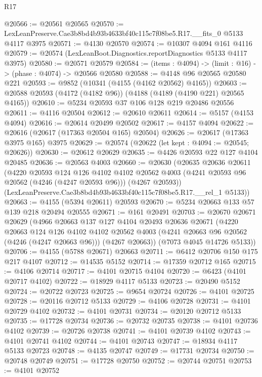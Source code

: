 \begin{lexlean}{R17}
\begin{coremodule}
@20566 := @20561 @20565
@20570 := LexLeanPreserve.Cae3b8bd4b93b4633bf40c115c7f08be5.R17.__fits_0 @5133 @4117 @3975
@20571 := @4130 @20570
@20574 := @10307 @4094 @161 @4116
@20579 := @20574 (LexLeanBoot.Diagnostics.reportDiagnostics @5133 @4117 @3975)
@20580 := @20571 @20579
@20584 := (items : @4094) -> (limit : @16) -> (phase : @4074) -> @20566 @20580
@20588 := @4148 @96 @20565 @20580 @221
@20593 := @9852 (@10341 (@4155 (@4162 @20562) @4165))
@20603 := @20588 @20593 (@4172 (@4182 @96)) (@4188 (@4189 (@4190 @221) @20565 @4165))
@20610 := @5234 @20593 @37 @106 @128 @219 @20486 @20556
@20611 := @4116 @20504
@20612 := @20610 @20611
@20614 := @5157 (@4153 @4094)
@20616 := @20614 @20499 @20502
@20617 := @4157 @4094
@20622 := @20616 (@20617 (@17363 @20504 @165) @20504)
@20626 := @20617 (@17363 @3975 @165) @3975
@20629 := @20574 (@20622 (let kept : @4094 := @20545; @20626))
@20630 := @20612 @20629
@20635 := @4426 @20593 @22 @127 @4104 @20485
@20636 := @20563 @4003
@20660 := @20630
    (@20635
      @20636
      @20611
      (@4220
        @20593
        @124
        @126
        @4102
        @4102
        @20562
        @4003
        (@4241 @20593 @96 @20562 (@4246 (@4247 @20593 @96)))
        (@4267 @20593))
      (LexLeanPreserve.Cae3b8bd4b93b4633bf40c115c7f08be5.R17.__rel_1 @5133))
@20663 := @4155 (@5394 @20611) @20593
@20670 := @5234 @20663 @133 @57 @139 @218 @20494 @20555
@20671 := @161 @20491
@20703 := @20670
    @20671
    @20629
    (@4966
      @20663
      @137
      @127
      @4104
      @20493
      @20636
      @20671
      (@4220
        @20663
        @124
        @126
        @4102
        @4102
        @20562
        @4003
        (@4241 @20663 @96 @20562 (@4246 (@4247 @20663 @96)))
        (@4267 @20663))
      (@7073 @4045 @14726 @5133))
@20706 := @4155 (@5788 @20671) @20663
@20711 := @6412 @20706 @150 @175 @217 @4107
@20712 := @14535 @5152
@20714 := @17359 @20712 @165
@20715 := @4106 @20714
@20717 := @4101 @20715 @4104
@20720 := @6423 (@4101 @20717 @4102)
@20722 := @18929 @4117 @5133
@20723 := @20490 @5152
@20724 := @20722 @20723
@20725 := @9654 @20724
@20726 := @4101 @20725
@20728 := @20116 @20712 @5133
@20729 := @4106 @20728
@20731 := @4101 @20729 @4102
@20732 := @4101 @20731
@20734 := @20120 @20712 @5133
@20735 := @17728 @20734
@20736 := @20732 @20735
@20738 := @4101 @20736 @4102
@20739 := @20726 @20738
@20741 := @4101 @20739 @4102
@20743 := @4101 @20741 @4102
@20744 := @4101 @20743
@20747 := @18934 @4117 @5133 @20723
@20748 := @4135 @20747
@20749 := @17731 @20734
@20750 := @20748 @20749
@20751 := @17728 @20750
@20752 := @20744 @20751
@20753 := @4101 @20752

\end{coremodule}
\end{lexlean}
